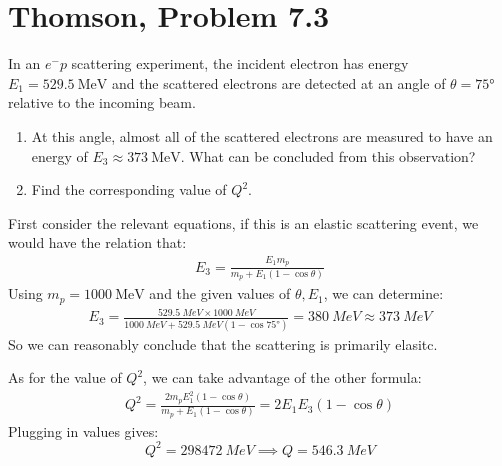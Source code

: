 \documentclass[12pt]{article}
\begin{document}
\section{Thomson, Problem 7.3}
\begin{problem}
  In an $e^-p$ scattering  experiment, the incident electron has energy $E_1=\SI{529.5}{\MeV}$ and the scattered electrons are detected  at an angle of $\theta=\ang{75}$ relative to the incoming beam.
  \begin{enumerate}[label = (\alph*)]
  \item At this angle, almost all of the scattered electrons are measured to have an energy of $E_3\approx\SI{373}{\MeV}$. What can be concluded from this observation?
  \item Find the corresponding value of $Q^2$.
  \end{enumerate}
\end{problem}
First consider the relevant equations, if this is an elastic scattering event, we would have the relation that:
\begin{align*}
  E_3=\frac{E_1 m_p}{m_p+E_1(1-\cos\theta)}
\end{align*}
Using $m_p=\SI{1000}{\MeV}$ and the given values of $\theta,E_1$, we can determine:
\begin{align*}
  E_3=\frac{\SI{529.5}{MeV}\times\SI{1000}{MeV}}
  {\SI{1000}{MeV}+\SI{529.5}{MeV}(1-\cos\ang{75})}
  =\SI{380}{MeV}\approx\SI{373}{MeV}
\end{align*}
So we can reasonably conclude that the scattering is primarily elasitc.

As for the value of $Q^2$, we can take advantage of the other formula:
\begin{align*}
  Q^2=\frac{2m_p E_1^2(1-\cos\theta)}{m_p+E_1(1-\cos\theta)}
  =2E_1 E_3(1-\cos\theta)
\end{align*}
Plugging in values gives:
\begin{equation}
  \label{eq:p2}
  \boxed{Q^2=\SI{298472}{MeV}\implies Q=\SI{546.3}{MeV}}
\end{equation}
\newpage
\end{document}
